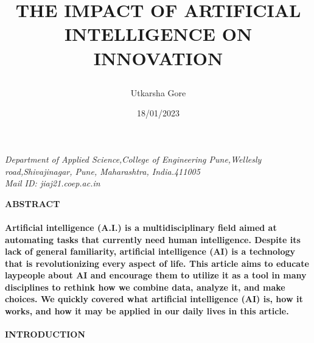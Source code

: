 \documentclass{article}
\title{\begin{LARGE}\textbf{THE IMPACT OF ARTIFICIAL INTELLIGENCE ON INNOVATION}\end{LARGE}}
\author{Utkarsha Gore}
\date{18/01/2023}
\begin{document}
\maketitle
{}
\textit{Department of Applied Science,College of Engineering Pune,Wellesly road,Shivajinagar, Pune, Maharashtra, India.411005 
\\Mail ID: jiaj21.coep.ac.in }
\newpage
{}

\newpage
{}
\begin{LARGE}
\begin{center} \textbf{ABSTRACT} \end{center}\end{LARGE}
	\paragraph{Artificial intelligence (A.I.) is a multidisciplinary field aimed at automating tasks that currently need human intelligence. Despite its lack of general familiarity, artificial intelligence (AI) is a technology that is revolutionizing every aspect of life. This article aims to educate laypeople about AI and encourage them to utilize it as a tool in many disciplines to rethink how we combine data, analyze it, and make choices. We quickly covered what artificial intelligence (AI) is, how it works, and how it may be applied in our daily lives in this article.}
\begin{LARGE}
\begin{center} \textbf{INTRODUCTION} \end{center}\end{LARGE}
\end{document}
